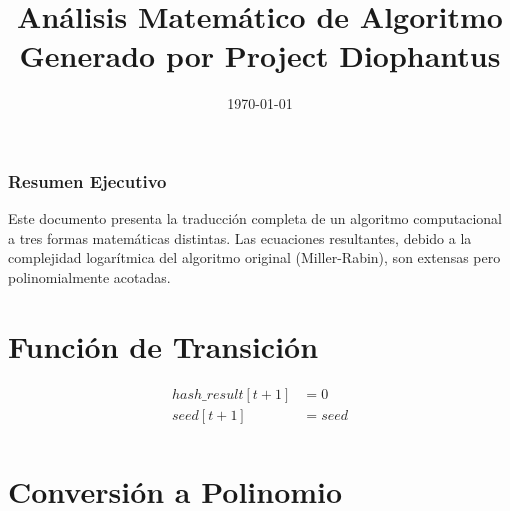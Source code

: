 \documentclass[10pt, a4paper]{article}
\title{Análisis Matemático de Algoritmo \\ \large Generado por Project Diophantus}
\author{}
\date{\today}
\begin{document}
\maketitle
\section*{Resumen Ejecutivo}
Este documento presenta la traducción completa de un algoritmo computacional a tres formas matemáticas distintas.
Las ecuaciones resultantes, debido a la complejidad logarítmica del algoritmo original (Miller-Rabin), son extensas pero polinomialmente acotadas.
\part{Función de Transición}
\begin{align*}
hash\_result[t+1] &= 0 \\
seed[t+1] &= seed \\
\end{align*}\part{Conversión a Polinomio}
\end{document}
